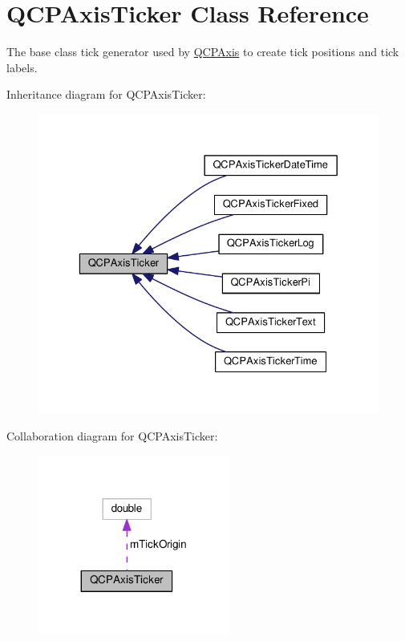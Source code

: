 \hypertarget{classQCPAxisTicker}{}\section{Q\+C\+P\+Axis\+Ticker Class Reference}
\label{classQCPAxisTicker}


The base class tick generator used by \hyperlink{classQCPAxis}{Q\+C\+P\+Axis} to create tick positions and tick labels.  




Inheritance diagram for Q\+C\+P\+Axis\+Ticker\+:
\nopagebreak
\begin{figure}[H]
\begin{center}
\leavevmode
\includegraphics[width=329pt]{classQCPAxisTicker__inherit__graph}
\end{center}
\end{figure}


Collaboration diagram for Q\+C\+P\+Axis\+Ticker\+:
\nopagebreak
\begin{figure}[H]
\begin{center}
\leavevmode
\includegraphics[width=179pt]{classQCPAxisTicker__coll__graph}
\end{center}
\end{figure}
